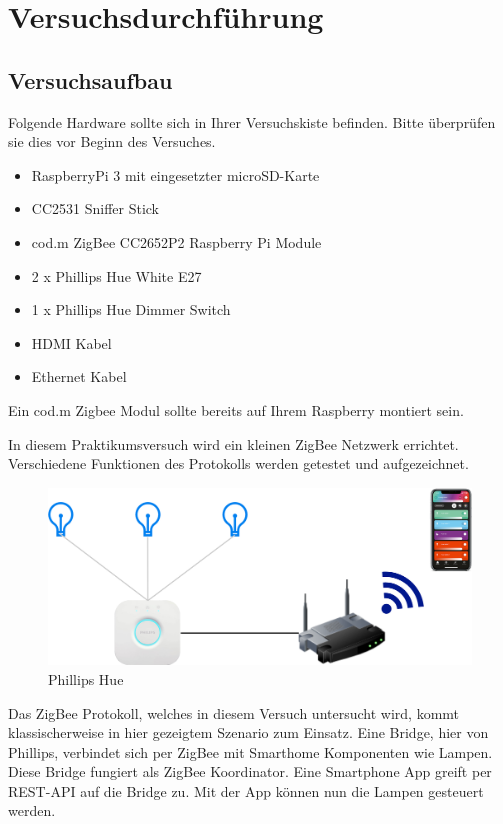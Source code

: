 \chapter{Versuchsdurchführung}

\section{Versuchsaufbau}

Folgende Hardware sollte sich in Ihrer Versuchskiste befinden. Bitte überprüfen sie dies vor Beginn des Versuches.

\begin{itemize}
    \item RaspberryPi 3 mit eingesetzter microSD-Karte
    \item CC2531 Sniffer Stick
    \item cod.m ZigBee CC2652P2 Raspberry Pi Module
    \item 2 x Phillips Hue White E27
    \item 1 x Phillips Hue Dimmer Switch
    \item HDMI Kabel
    \item Ethernet Kabel
\end{itemize}

Ein cod.m Zigbee Modul sollte bereits auf Ihrem Raspberry montiert sein. 

In diesem Praktikumsversuch wird ein kleinen ZigBee Netzwerk errichtet. Verschiedene Funktionen des Protokolls werden getestet und aufgezeichnet.


\begin{figure}[H]
    \centering
    \includegraphics[width=1\textwidth]{media/zbhue.png}
    \caption{Phillips Hue}
\end{figure}
Das ZigBee Protokoll, welches in diesem Versuch untersucht wird, kommt klassischerweise in hier gezeigtem Szenario zum Einsatz.
Eine Bridge, hier von Phillips, verbindet sich per ZigBee mit Smarthome Komponenten wie Lampen. Diese Bridge fungiert als ZigBee Koordinator. 
Eine Smartphone App greift per REST-API auf die Bridge zu. Mit der App können nun die Lampen gesteuert werden.

